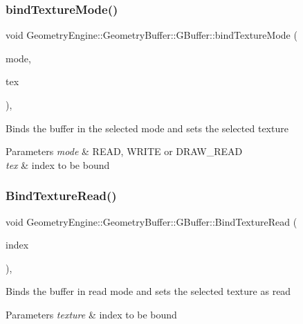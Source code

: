 \subsubsection{\texorpdfstring{bindTextureMode()}{bindTextureMode()}}
{\footnotesize\ttfamily void Geometry\+Engine\+::\+Geometry\+Buffer\+::\+G\+Buffer\+::bind\+Texture\+Mode (\begin{DoxyParamCaption}\item[{Geometry\+Buffer\+::\+G\+\_\+\+F\+R\+A\+M\+E\+B\+U\+F\+F\+E\+R\+\_\+\+B\+I\+N\+DS}]{mode,  }\item[{unsigned int}]{tex }\end{DoxyParamCaption})\hspace{0.3cm}{\ttfamily [protected]}, {\ttfamily [virtual]}}

Binds the buffer in the selected mode and sets the selected texture 
\begin{DoxyParams}{Parameters}
{\em mode} & R\+E\+AD, W\+R\+I\+TE or D\+R\+A\+W\+\_\+\+R\+E\+AD \\
\hline
{\em tex} & index to be bound \\
\hline
\end{DoxyParams}
\mbox{\label{class_geometry_engine_1_1_geometry_buffer_1_1_g_buffer_a40c1b8f341429f061a381ba98574ea82}} 
\subsubsection{\texorpdfstring{BindTextureRead()}{BindTextureRead()}}
{\footnotesize\ttfamily void Geometry\+Engine\+::\+Geometry\+Buffer\+::\+G\+Buffer\+::\+Bind\+Texture\+Read (\begin{DoxyParamCaption}\item[{unsigned int}]{index }\end{DoxyParamCaption})\hspace{0.3cm}{\ttfamily [override]}, {\ttfamily [virtual]}}

Binds the buffer in read mode and sets the selected texture as read 
\begin{DoxyParams}{Parameters}
{\em texture} & index to be bound \\
\hline
\end{DoxyParams}


